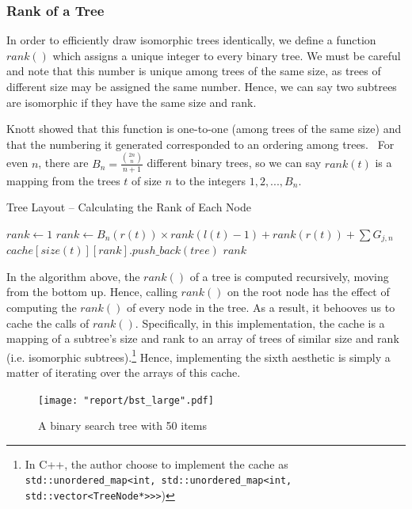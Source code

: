 \documentclass[11pt]{report}
\begin{document}
\subsubsection{Rank of a Tree}
In order to efficiently draw isomorphic trees identically, we define a function $rank()$ which assigns a unique integer to every binary tree. We must be careful and note that this number is unique among trees of the same size, as trees of different size may be assigned the same number. Hence, we can say two subtrees are isomorphic if they have the same size and rank.

\bigskip

Knott showed that this function is one-to-one (among trees of the same size) and that the numbering it generated corresponded to an ordering among trees.~\cite{Knott:1977:NSB:359423.359434} For even $n$, there are $B_n = \frac{ \binom{2n}{n} }{ n + 1 }$ different binary trees, so we can say $rank(t)$ is a mapping from the trees $t$ of size $n$ to the integers $1, 2, ..., B_n$.
\begin{algorithm}[H]
    \caption{Tree Layout -- Calculating the Rank of Each Node}
    \begin{algorithmic}[1]
            \State $rank \gets 1$
        \Else
            \State $rank \gets B_n(r(t)) \times rank(l(t) - 1) + rank(r(t)) + \sum G_{j,n}$
        \EndIf
        \State $cache[size(t)][rank].push\_back(tree)$
        \State \Return $rank$
        \EndProcedure
    \end{algorithmic}
\end{algorithm}

In the algorithm above, the $rank()$ of a tree is computed recursively, moving from the bottom up. Hence, calling $rank()$ on the root node has the effect of computing the $rank()$ of every node in the tree. As a result, it behooves us to cache the calls of $rank()$. Specifically, in this implementation, the cache is a mapping of a subtree's size and rank to an array of trees of similar size and rank (i.e. isomorphic subtrees).\footnote{In C++, the author choose to implement the cache as \\ \lstinline{std::unordered_map<int, std::unordered_map<int, std::vector<TreeNode*>>>})} Hence, implementing the sixth aesthetic is simply a matter of iterating over the arrays of this cache.

\begin{figure}
    \centering
    \texttt{[image: "report/bst\_large".pdf]}
    \caption{A binary search tree with 50 items}
\end{figure}
\end{document}
